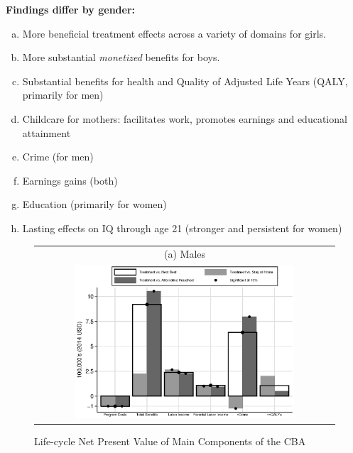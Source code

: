 \documentclass[static]{JJH-Beamer}
\begin{document}
\begin{frame}

\begin{center}
\textbf{Findings differ by gender:}
\end{center}

    \begin{enumerate}[(a)]
    \item More beneficial treatment effects across a variety of domains for girls.
    \item More substantial \emph{monetized} benefits for boys.
    \item Substantial benefits for health and Quality of Adjusted Life Years (QALY, primarily for men)
    \item Childcare for mothers: facilitates work, promotes earnings and educational attainment
    \item Crime (for men)
    \item Earnings gains (both)
    \item Education (primarily for women)
    \item Lasting effects on IQ through age 21 (stronger and persistent for women)
    \end{enumerate}

\end{frame} 


\begin{figure}[H]
\caption{Life-cycle Net Present Value of Main Components of the CBA}\label{fig:npvsgender}
\begin{center}
\begin{tabular}{c}
(a) Males\\
\includegraphics[width=0.75\textwidth]{output/abccare_npvs2.eps}
\end{tabular}
\end{center}
\end{figure}
\end{document}

